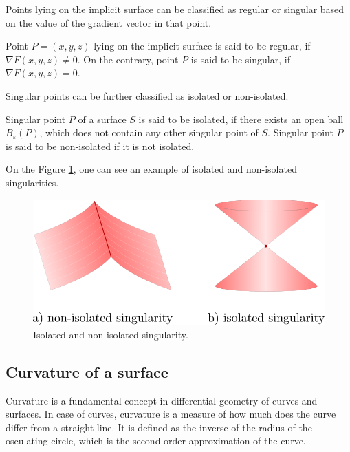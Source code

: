 Points lying on the implicit surface can be classified as regular or
singular based on the value of the gradient vector in that point.

\begin{definition}
    Point $P=(x,y,z)$ lying on the implicit surface is said to be regular,
    if $\nabla F(x, y, z) \neq 0$. On the contrary, point $P$ is said to be 
    singular, if $\nabla F(x, y, z) = 0$.
\end{definition}

Singular points can be further classified as isolated or non-isolated.

\begin{definition}
    Singular point $P$ of a surface $S$ is said to be isolated,
    if there exists an open ball $B_\varepsilon(P)$, which does not 
    contain any other singular point of $S$.
    Singular point $P$ is said to be non-isolated if it is not isolated.
\end{definition}

On the Figure \ref{img:2}, one can see an example of isolated and non-isolated
singularities.

\begin{figure}
    \centerline{\includegraphics[scale=0.5]{images/img2}}
    \caption[Isolated and non-isolated singularity]
    {Isolated and non-isolated singularity.}
    \label{img:2}
\end{figure}

\subsection{Curvature of a surface}

Curvature is a fundamental concept in differential geometry of curves and surfaces.
In case of curves, curvature is a measure of how much does the curve differ from a 
straight line. It is defined as the inverse of the radius of the osculating circle,
which is the second order approximation of the curve.

